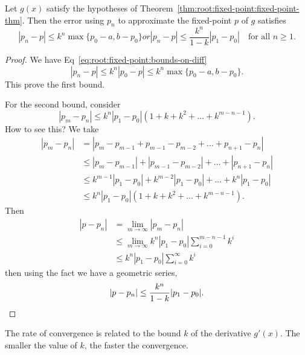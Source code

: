 \begin{cor}
  Let $g(x)$ satisfy the hypotheses of Theorem~\ref{thm:root:fixed-point:fixed-point-thm}. 
  Then the error using $p_{n}$ to approximate the fixed-point $p$ of $g$
  satisfies
  \begin{subequations}
    \begin{equation}
      |p_{n}-p| \leq k^{n}\max\{p_{0}-a,b-p_{0}\}
    \end{equation}
    or
    \begin{equation}
      |p_{n}-p|\leq\frac{k^{n}}{1-k}|p_{1}-p_{0}|\quad\mbox{for all }n\geq1.
    \end{equation}
  \end{subequations}
\end{cor}
\begin{proof}
  We have Eq~\eqref{eq:root:fixed-point:bounds-on-diff}
  \begin{equation}
    |p_{n}-p|\leq k^{n}|p_{0}-p|\leq k^{n}\max\{p_{0}-a,b-p_{0}\}.
  \end{equation}
  This prove the first bound.

  For the second bound, consider
  \begin{equation}
    |p_{m}-p_{n}|\leq k^{n} |p_{1}-p_{0}| (1 + k + k^{2} + \dots + k^{m-n-1}).
  \end{equation}
  How to see this? We take
  \begin{subequations}
    \begin{align}
    |p_{m}-p_{n}| &=
    |p_{m}-p_{m-1}+p_{m-1}-p_{m-2}+\dots+p_{n+1}-p_{n}|\\
    &\leq |p_{m}-p_{m-1}|+|p_{m-1}-p_{m-2}|+\dots+|p_{n+1}-p_{n}|\\
    &\leq k^{m-1}|p_{1}-p_{0}| + k^{m-2}|p_{1}-p_{0}| + \dots + k^{n}|p_{1}-p_{0}|\\
    &\leq k^{n}|p_{1}-p_{0}|(1 + k + k^{2} + \dots + k^{m-n-1}).
    \end{align}
  \end{subequations}
  Then
  \begin{subequations}
  \begin{align}
    |p - p_{n}| &= \lim_{m\to\infty}|p_{m}-p_{n}|\\
    &\leq\lim_{m\to\infty}k^{n}|p_{1}-p_{0}|\sum^{m-n-1}_{i=0}k^{i}\\
    &\leq k^{n}|p_{1}-p_{0}|\sum^{\infty}_{i=0}k^{i}
  \end{align}
  \end{subequations}
  then using the fact we have a geometric series,
  \begin{equation*}
    |p-p_{n}|\leq \frac{k^{n}}{1-k}|p_{1}-p_{0}|.\qedhere
  \end{equation*}
\end{proof}
\begin{rmk}
  The rate of convergence is related to the bound $k$ of the derivative
  $g'(x)$. The smaller the value of $k$, the faster the convergence.
\end{rmk}